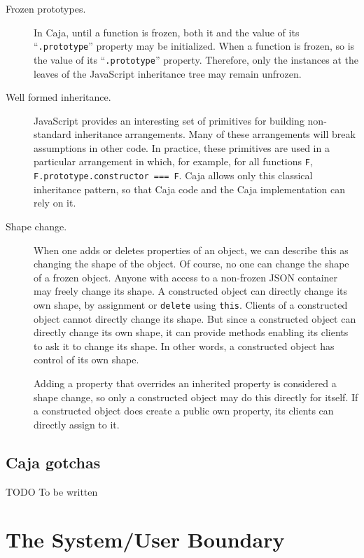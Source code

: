 \documentclass[letterpaper,twocolumn,10pt]{article}
\newcommand{\code}[1]{{\tt {#1}}}              %
\begin{document}
\begin{description}

  \item[Frozen prototypes.] In Caja, until a function is frozen, both it and 
  the value of its ``\code{.prototype}'' property may be initialized. When a 
  function is frozen, so is the value of its ``\code{.prototype}'' property. 
  Therefore, only the instances at the leaves of the JavaScript inheritance 
  tree may remain unfrozen.
  
   \item[Well formed inheritance.] JavaScript provides an interesting set of 
   primitives for building non-standard inheritance arrangements. Many of 
   these arrangements will break assumptions in other code. In practice, 
   these primitives are used in a particular arrangement in which, for 
   example, for all functions \code{F}, \code{F.prototype.constructor === F}. 
   Caja allows only this classical inheritance pattern, so that Caja code and 
   the Caja implementation can rely on it.
   
   \item[Shape change.] When one adds or deletes properties of an object, we 
   can describe this as changing the shape of the object. Of course, no one 
   can change the shape of a frozen object. Anyone with access to a 
   non-frozen JSON container may freely change its shape. A constructed 
   object can directly change its own shape, by assignment or \code{delete} 
   using \code{this}. Clients of a constructed object cannot directly change 
   its shape. But since a constructed object can directly change its own 
   shape, it can provide methods enabling its clients to ask it to change its 
   shape. In other words, a constructed object has control of its own shape.
   
   Adding a property that overrides an inherited property is considered a 
   shape change, so only a constructed object may do this directly for 
   itself. If a constructed object does create a public own property, its 
   clients can directly assign to it.
   
  
\end{description}

\subsection{Caja gotchas}

TODO To be written

\section{The System/User Boundary}
\label{sec:boundary}
\end{document}

